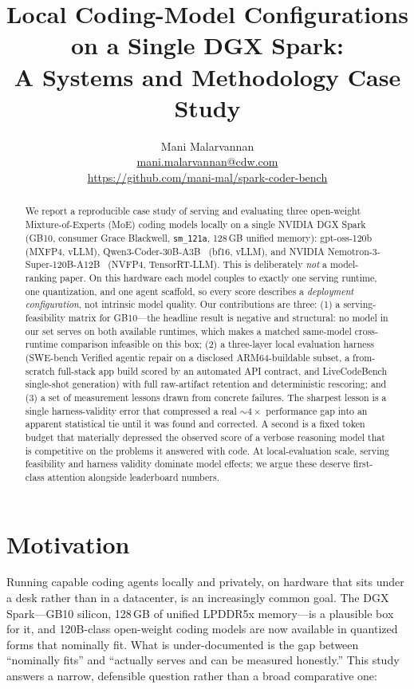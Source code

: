 \documentclass[10pt,twocolumn]{article}
\title{\bfseries Local Coding-Model Configurations\\ on a Single DGX Spark:\\
A Systems and Methodology Case Study}
\author{Mani Malarvannan \\ \small\href{mailto:mani.malarvannan@cdw.com}{mani.malarvannan@cdw.com} \\ \small\url{https://github.com/mani-mal/spark-coder-bench}}
\date{}
\newcommand{\code}[1]{\texttt{\small #1}}
\begin{document}
\maketitle

\begin{abstract}
We report a reproducible case study of serving and evaluating three open-weight
Mixture-of-Experts (MoE) coding models locally on a single NVIDIA DGX Spark
(GB10, consumer Grace Blackwell, \code{sm\_121a}, 128\,GB unified memory):
gpt-oss-120b~\cite{gptoss} (MXFP4, vLLM), Qwen3-Coder-30B-A3B~\cite{qwen3} (bf16, vLLM), and
NVIDIA Nemotron-3-Super-120B-A12B~\cite{nemotron} (NVFP4, TensorRT-LLM). This is deliberately
\emph{not} a model-ranking paper. On this hardware each model couples to exactly one
serving runtime, one quantization, and one agent scaffold, so every score describes
a \emph{deployment configuration}, not intrinsic model quality. Our contributions are
three: (1) a serving-feasibility matrix for GB10---the headline result is negative and
structural: no model in our set serves on both available runtimes, which makes a
matched same-model cross-runtime comparison infeasible on this box; (2) a three-layer
local evaluation harness (SWE-bench Verified agentic repair on a disclosed ARM64-buildable
subset, a from-scratch full-stack app build scored by an automated API contract, and
LiveCodeBench single-shot generation) with full raw-artifact retention and deterministic
rescoring; and (3) a set of measurement lessons drawn from concrete failures.
The sharpest lesson is a single harness-validity error that compressed a real
${\sim}4\times$ performance gap into an apparent statistical tie until it was found and
corrected. A second is a fixed token budget that materially depressed the observed score of a
verbose reasoning model that is competitive on the problems it answered with code. At local-evaluation scale,
serving feasibility and harness validity dominate model effects; we argue these deserve
first-class attention alongside leaderboard numbers.
\end{abstract}

\section{Motivation}

Running capable coding agents locally and privately, on hardware that sits under a desk
rather than in a datacenter, is an increasingly common goal. The DGX Spark---GB10 silicon,
128\,GB of unified LPDDR5x memory---is a plausible box for it, and 120B-class open-weight
coding models are now available in quantized forms that nominally fit. What is
under-documented is the gap between ``nominally fits'' and ``actually serves and can be
measured honestly.'' This study answers a narrow, defensible question rather than a broad
comparative one:
\end{document}
